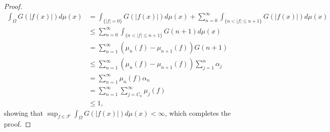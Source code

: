 \documentclass{article}
\theoremstyle{definition}
\theoremstyle{definition}
\begin{document}
\begin{proof}
\begin{align*}
\int_\Omega G(|f(x)|) d\mu(x)&=\int_{\{|f|=0\}} G(|f(x)|) d\mu(x)+ \sum_{n=0}^\infty \int_{\{n < |f| \leq n+1\}}
G(|f(x)|) d\mu(x)\\
&\leq  \sum_{n=0}^\infty \int_{\{n<|f| \leq n+1\}} G(n+1) d\mu(x)\\
&= \sum_{n=1}^\infty (\mu_n(f)-\mu_{n+1}(f)) G(n+1)\\
&\leq \sum_{n=1}^\infty (\mu_n(f)-\mu_{n+1}(f)) \sum_{j=1}^n \alpha_j\\
&=\sum_{n=1}^\infty \mu_n(f) \alpha_n\\
&=\sum_{n=1}^\infty \sum_{j=C_n}^\infty \mu_j(f)\\
&\leq 1,
\end{align*}
showing that $\sup_{f \in \mathscr{F}} \int_\Omega G(|f(x)|) d\mu(x)<\infty$, which completes the proof.
\end{proof}
\end{document}
